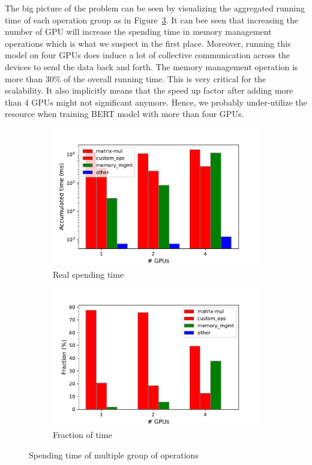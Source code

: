 The big picture of the problem can be seen by visualizing the aggregated running time of each operation group as in Figure~\ref{fig:bert:group_runtime}. It can bee seen that increasing the number of GPU will increase the spending time in memory management operations which is what we suspect in the first place. Moreover, running this model on four GPUs does induce a lot of collective communication across the devices to send the data back and forth. The memory management operation is more than 30\% of the overall running time. This is very critical for the scalability. It also implicitly means that the speed up factor after adding more than 4 GPUs might not significant anymore. Hence, we probably under-utilize the resource when training BERT model with more than four GPUs.


\begin{figure}[htbp]
    \centering
    \begin{subfigure}{.5\textwidth}
        \centering
        \includegraphics[width=\linewidth]{fig/bert/timegroup.pdf}
        \caption{Real spending time}
        \label{fig:bert:timegroup}
    \end{subfigure}%
    \begin{subfigure}{.5\textwidth}
        \centering
        \includegraphics[width=\linewidth]{fig/bert/timegroup_frac.pdf}
        \caption{Fraction of time}
        \label{fig:bert:timegroup_frac}
    \end{subfigure}
    \caption{Spending time of multiple group of operations}
\label{fig:bert:group_runtime}
\end{figure}


